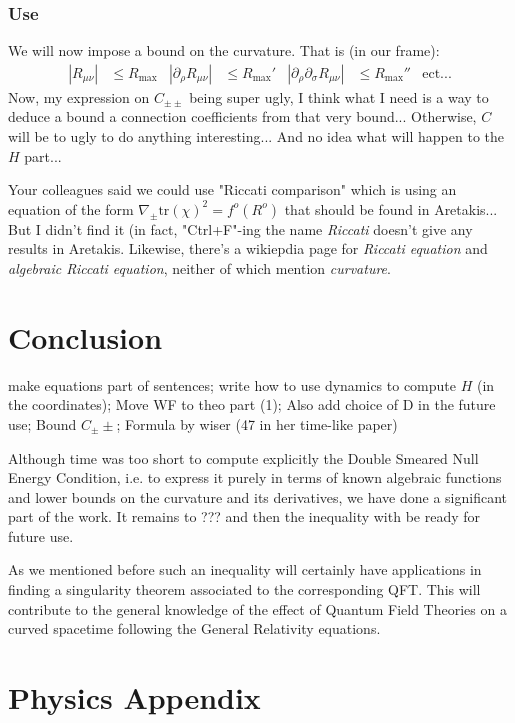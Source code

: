 \documentclass[a4paper,11pt]{article}
\numberwithin{equation}{section}
\theoremstyle{definition}
\begin{document}
\subsubsection{Use}
We will now impose a bound on the curvature. That is (in our frame):
\begin{align}
    |R_{\mu\nu}| &\leq R_\mathrm{max}&
    |\partial_\rho R_{\mu\nu}| &\leq
    R_\mathrm{max}'&
    |\partial_\rho\partial_\sigma
    R_{\mu\nu}| & \leq R_\mathrm{max}''&
    \mathrm{ect}...
\end{align}
\color{red} Now, my expression on $C_{\pm\pm}$ being super ugly, I think what I need is a way to deduce a bound a connection coefficients from that very bound... Otherwise, $C$ will be to ugly to do anything interesting... And no idea what will happen to the $H$ part... 

Your colleagues said we could use "Riccati comparison" which is using an equation of the form $\nabla_\pm \mathrm{tr}(\chi)^2 = f^o(R^o)$ that should be found in Aretakis... But I didn't find it (in fact, "Ctrl+F"-ing the name \emph{Riccati} doesn't  give any results in Aretakis. Likewise, there's a wikiepdia page for \emph{Riccati equation} and \emph{algebraic Riccati equation}, neither of which mention \emph{curvature}. \color{black}

\section{Conclusion}
\color{red} make equations part of sentences;
write how to use dynamics to compute $H$ (in the coordinates);
Move WF to theo part (1);
Also add choice of D in the future use;
Bound $C_\pm\pm$;
Formula by wiser (47 in her time-like paper)\color{black}

Although time was too short to compute explicitly the Double Smeared Null Energy Condition, i.e. to express it purely in terms of known algebraic functions and lower bounds on the curvature and its derivatives, we have done a significant part of the work. It remains to \color{red} ??? \color{black} and then the inequality with be ready for future use.

As we mentioned before such an inequality will certainly have applications in finding a singularity theorem associated to the corresponding QFT. This will contribute to the general knowledge of the effect of Quantum Field Theories on a curved spacetime following the General Relativity equations.
\newpage
\appendix
\section{Physics Appendix}
\end{document}
